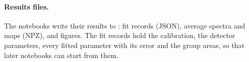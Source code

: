 \paragraph{Results files.} The notebooks write their results to : fit records
(JSON), average spectra and maps (NPZ), and figures. The fit records hold the calibration, the
detector parameters, every fitted parameter with its error and the group areas, so that later
notebooks can start from them.
